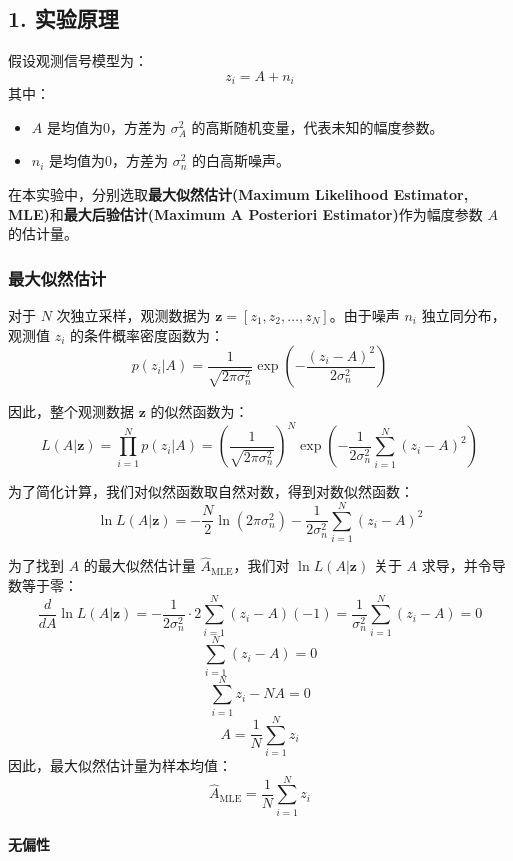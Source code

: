 \documentclass[12pt]{ctexart}
\begin{document}
\subsection*{1. 实验原理}

假设观测信号模型为：
\[
z_i = A + n_i
\]
其中：
\begin{itemize}
    \item \( A \) 是均值为0，方差为 \( \sigma_A^2 \) 的高斯随机变量，代表未知的幅度参数。
    \item \( n_i \) 是均值为0，方差为 \( \sigma_n^2 \) 的白高斯噪声。
\end{itemize}

在本实验中，分别选取\textbf{最大似然估计(Maximum Likelihood Estimator, MLE)}和\textbf{最大后验估计(Maximum A Posteriori Estimator)}作为幅度参数 \( A \) 的估计量。

\subsubsection*{最大似然估计}

对于 \( N \) 次独立采样，观测数据为 \( \mathbf{z} = [z_1, z_2, \ldots, z_N] \)。由于噪声 \( n_i \) 独立同分布，观测值 \( z_i \) 的条件概率密度函数为：
\[
p(z_i | A) = \frac{1}{\sqrt{2\pi\sigma_n^2}} \exp\left( -\frac{(z_i - A)^2}{2\sigma_n^2} \right)
\]

因此，整个观测数据 \( \mathbf{z} \) 的似然函数为：
\[
L(A | \mathbf{z}) = \prod_{i=1}^{N} p(z_i | A) = \left( \frac{1}{\sqrt{2\pi\sigma_n^2}} \right)^N \exp\left( -\frac{1}{2\sigma_n^2} \sum_{i=1}^{N} (z_i - A)^2 \right)
\]

为了简化计算，我们对似然函数取自然对数，得到对数似然函数：
\[
\ln L(A | \mathbf{z}) = -\frac{N}{2} \ln(2\pi\sigma_n^2) - \frac{1}{2\sigma_n^2} \sum_{i=1}^{N} (z_i - A)^2
\]

为了找到 \( A \) 的最大似然估计量 \( \hat{A}_{\text{MLE}} \)，我们对 \( \ln L(A | \mathbf{z}) \) 关于 \( A \) 求导，并令导数等于零：
\[
\frac{d}{dA} \ln L(A | \mathbf{z}) = -\frac{1}{2\sigma_n^2} \cdot 2 \sum_{i=1}^{N} (z_i - A) (-1) = \frac{1}{\sigma_n^2} \sum_{i=1}^{N} (z_i - A) = 0
\]
\[
\sum_{i=1}^{N} (z_i - A) = 0
\]
\[
\sum_{i=1}^{N} z_i - N A = 0
\]
\[
A = \frac{1}{N} \sum_{i=1}^{N} z_i
\]
因此，最大似然估计量为样本均值：
\[
\hat{A}_{\text{MLE}} = \frac{1}{N} \sum_{i=1}^{N} z_i
\]

\paragraph{无偏性}
\end{document}
